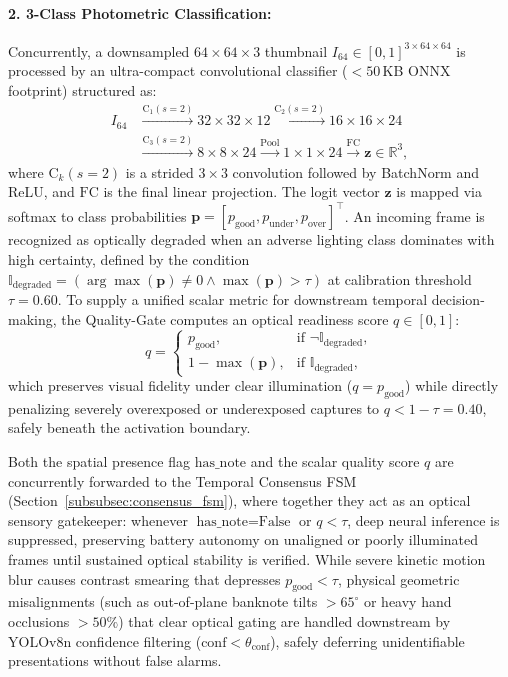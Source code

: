 \documentclass[final,5p,times,twocolumn,authoryear]{elsarticle}
\begin{document}
\paragraph{2. 3-Class Photometric Classification:}
Concurrently, a downsampled $64 \times 64 \times 3$ thumbnail $I_{64} \in [0, 1]^{3 \times 64 \times 64}$ is processed by an ultra-compact convolutional classifier ($<50$\,KB ONNX footprint) structured as:
\begin{equation}
\label{eq:quality_cnn}
\begin{aligned}
I_{64} &\xrightarrow{\text{C}_1(s=2)} 32\times 32\times 12 \xrightarrow{\text{C}_2(s=2)} 16\times 16\times 24 \\
       &\xrightarrow{\text{C}_3(s=2)} 8\times 8\times 24 \xrightarrow{\text{Pool}} 1\times 1\times 24 \xrightarrow{\text{FC}} \mathbf{z} \in \mathbb{R}^3,
\end{aligned}
\end{equation}
where $\text{C}_k(s=2)$ is a strided $3\times 3$ convolution followed by BatchNorm and ReLU, and $\text{FC}$ is the final linear projection. The logit vector $\mathbf{z}$ is mapped via softmax to class probabilities $\mathbf{p} = [p_{\text{good}}, p_{\text{under}}, p_{\text{over}}]^\top$. An incoming frame is recognized as optically degraded when an adverse lighting class dominates with high certainty, defined by the condition $\mathbb{I}_{\text{degraded}} = \left(\arg\max(\mathbf{p}) \neq 0 \land \max(\mathbf{p}) > \tau\right)$ at calibration threshold $\tau = 0.60$. To supply a unified scalar metric for downstream temporal decision-making, the Quality-Gate computes an optical readiness score $q \in [0, 1]$:
\begin{equation}
q = \begin{cases}
p_{\text{good}}, & \text{if } \neg \mathbb{I}_{\text{degraded}}, \\
1 - \max(\mathbf{p}), & \text{if } \mathbb{I}_{\text{degraded}},
\end{cases}
\label{eq:quality_score}
\end{equation}
which preserves visual fidelity under clear illumination ($q = p_{\text{good}}$) while directly penalizing severely overexposed or underexposed captures to $q < 1 - \tau = 0.40$, safely beneath the activation boundary.

Both the spatial presence flag $\text{has\_note}$ and the scalar quality score $q$ are concurrently forwarded to the Temporal Consensus FSM (Section~\ref{subsubsec:consensus_fsm}), where together they act as an optical sensory gatekeeper: whenever $\text{has\_note} = \text{False}$ or $q < \tau$, deep neural inference is suppressed, preserving battery autonomy on unaligned or poorly illuminated frames until sustained optical stability is verified. While severe kinetic motion blur causes contrast smearing that depresses $p_{\text{good}} < \tau$, physical geometric misalignments (such as out-of-plane banknote tilts $>65^\circ$ or heavy hand occlusions $>50\%$) that clear optical gating are handled downstream by YOLOv8n confidence filtering ($\text{conf} < \theta_{\text{conf}}$), safely deferring unidentifiable presentations without false alarms.
\end{document}
